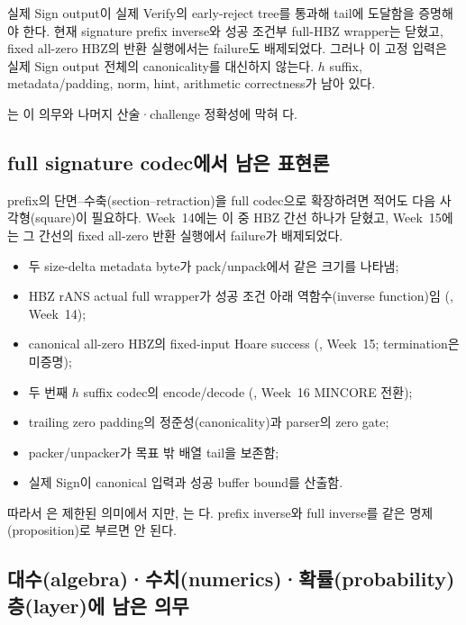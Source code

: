 \begin{openobligation}
실제 Sign output이 실제 Verify의 early-reject tree를 통과해 tail에 도달함을
증명해야 한다. 현재 signature prefix inverse와 성공 조건부 full-HBZ wrapper는
닫혔고, fixed all-zero HBZ의 반환 실행에서는 failure도 배제되었다. 그러나 이
고정 입력은 실제 Sign output 전체의 canonicality를 대신하지 않는다. \(h\)
suffix, metadata/padding, norm, hint, arithmetic correctness가 남아 있다.
\end{openobligation}

는 이 의무와 나머지 산술·challenge
정확성에 막혀 \statusblocked 다.

\subsection{full signature codec에서 남은 표현론}

prefix의 단면--수축(section--retraction)을 full codec으로 확장하려면 적어도
다음 사각형(square)이 필요하다. Week~14에는 이 중 HBZ 간선 하나가 닫혔고,
Week~15에는 그 간선의 fixed all-zero 반환 실행에서 failure가 배제되었다.

\begin{itemize}
  \item 두 size-delta metadata byte가 pack/unpack에서 같은 크기를 나타냄;
  \item HBZ rANS actual full wrapper가 성공 조건 아래 역함수(inverse function)임
        (\statusproved, Week~14);
  \item canonical all-zero HBZ의 fixed-input Hoare success
        (\statusproved, Week~15; termination은 미증명);
  \item 두 번째 \(h\) suffix codec의 encode/decode
        (\statusdeferred, Week~16 MINCORE 전환);
  \item trailing zero padding의 정준성(canonicality)과 parser의 zero gate;
  \item packer/unpacker가 목표 밖 배열 tail을 보존함;
  \item 실제 Sign이 canonical 입력과 성공 buffer bound를 산출함.
\end{itemize}

따라서
은 제한된 의미에서 \statusproved 지만,
는 \statusblocked 다. prefix inverse와 full
inverse를 같은 명제(proposition)로 부르면 안 된다.

\subsection{대수(algebra)·수치(numerics)·확률(probability) 층(layer)에 남은 의무}

